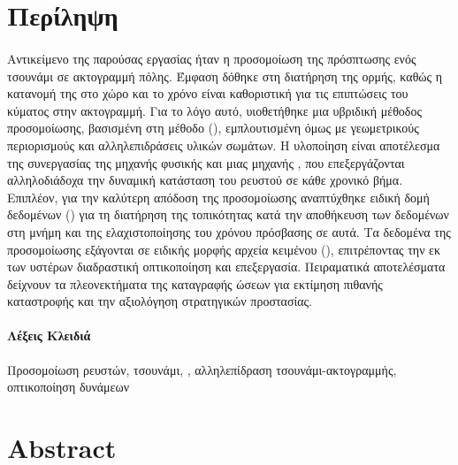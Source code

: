 \section*{Περίληψη}
\paragraph{} Αντικείμενο της παρούσας εργασίας ήταν η προσομοίωση της πρόσ\-πτω\-σης ενός
τσουνάμι σε ακτογραμμή πόλης. Έμφαση δόθηκε στη διατήρηση της ορμής, καθώς η κατανομή της
στο χώρο και το χρόνο είναι καθοριστική για τις επιπτώσεις του κύματος στην
ακτογραμμή. Για το λόγο αυτό, υιοθετήθηκε μια υβριδική μέθοδος προσομοίωσης, βασισμένη στη
μέθοδο  (), εμπλουτισμένη όμως με
γεωμετρικούς περιορισμούς και αλληλεπιδράσεις υλικών σωμάτων. Η υλοποίηση είναι αποτέλεσμα
της συνεργασίας της μηχανής φυσικής  και μιας μηχανής , που
επεξεργάζονται αλληλοδιάδοχα την δυναμική κατάσταση του ρευστού σε κάθε χρονικό
βήμα. Επιπλέον, για την καλύτερη απόδοση της προσομοίωσης αναπτύχθηκε ειδική δομή
δεδομένων () για τη διατήρηση της τοπικότητας κατά την αποθήκευση των
δεδομένων στη μνήμη και της ελαχιστοποίησης του χρόνου πρόσβασης σε αυτά. Τα δεδομένα της
προσομοίωσης εξάγονται σε ειδικής μορφής αρχεία κειμένου (), επιτρέποντας την εκ
των υστέρων διαδραστική οπτικοποίηση και επεξεργασία. Πειραματικά αποτελέσματα δείχνουν τα
πλεονεκτήματα της καταγραφής ώσεων για εκτίμηση πιθανής καταστροφής και την αξιολόγηση
στρατηγικών προστασίας.

\paragraph{Λέξεις Κλειδιά} Προσομοίωση ρευστών, τσουνάμι, , αλληλεπίδραση
τσουνάμι-α\-κτο\-γραμ\-μής, οπτικοποίηση δυνάμεων
\clearpage
\section*{Abstract}
